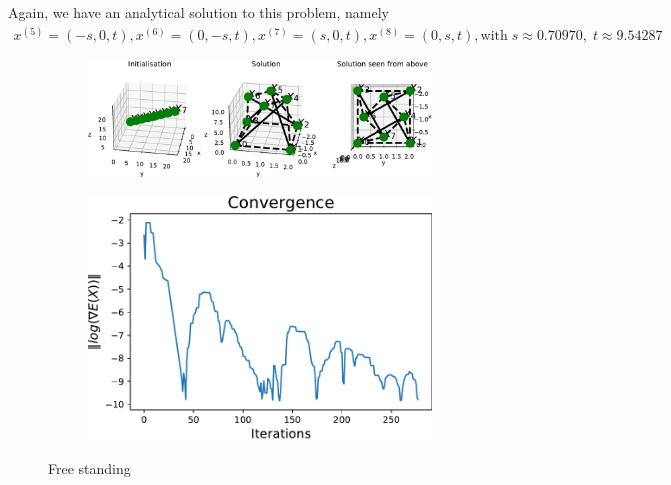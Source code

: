 Again, we have an analytical solution to this problem, namely 
\begin{equation*}
    \begin{gathered}
    x^{(5)} = (-s,0,t),x^{(6)} = (0,-s,t),x^{(7)} = (s,0,t),x^{(8)} = (0,s,t),  \text{with}\; s \approx 0.70970, \; t \approx 9.54287
    \end{gathered}
\end{equation*}


\begin{figure}[!ht]
\centering
\begin{subfigure}{.72\textwidth}
  \centering
  \includegraphics[width=0.99\linewidth]{Bilder/FREESTANDING.pdf}
\end{subfigure}%
\begin{subfigure}{.3\textwidth}
  \centering
  \includegraphics[width=0.99\linewidth]{Bilder/FREESTANDINGconv.pdf}
  \label{fig:sub2}
\end{subfigure}
\caption{Free standing}
\label{P69}
\end{figure}


